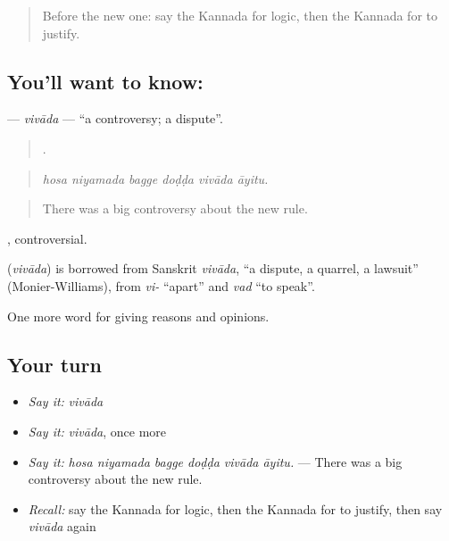 \label{lesson:KA-C377-vivada}



\begin{quote}
Before the new one: say the Kannada for logic, then the Kannada for to justify.
\end{quote}

\subsection*{You'll want to know: }
\textbf{} — \emph{vivāda} — \textquotedblleft{}a controversy; a dispute\textquotedblright{}.

\begin{quote}
     .
\end{quote}

\begin{quote}
\emph{hosa niyamada bagge doḍḍa vivāda āyitu.}
\end{quote}

\begin{quote}
There was a big controversy about the new rule.
\end{quote}

, controversial.

\begin{cousinweb}
\textbf{} (\emph{vivāda}) is borrowed from Sanskrit \emph{vivāda}, \textquotedblleft{}a dispute, a quarrel, a lawsuit\textquotedblright{} (Monier-Williams), from \emph{vi-} \textquotedblleft{}apart\textquotedblright{} and \emph{vad} \textquotedblleft{}to speak\textquotedblright{}.
\end{cousinweb}

\begin{grammarlens}[title={What you've built}]
One more word for giving reasons and opinions.
\end{grammarlens}

\subsection*{Your turn}
\begin{itemize}
\raggedright
  \item \emph{Say it:} \emph{vivāda}
  \item \emph{Say it:} \emph{vivāda}, once more
  \item \emph{Say it:} \emph{hosa niyamada bagge doḍḍa vivāda āyitu.} — There was a big controversy about the new rule.
  \item \emph{Recall:} say the Kannada for logic, then the Kannada for to justify, then say \emph{vivāda} again
\end{itemize}

